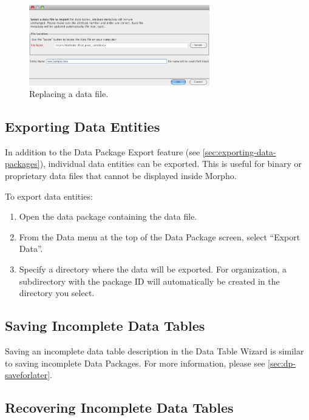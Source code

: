 \begin{figure}
  \centering
    \includegraphics[width=0.7\textwidth]{images/replace-data-location.png}
  \caption{Replacing a data file.}
  \label{fig:replace-data-location}
\end{figure}

\subsection[Exporting Data Entities]{Exporting Data Entities}
\label{sec:exporting-entities}

In addition to the Data Package Export feature (see \autoref{sec:exporting-data-packages}),
individual data entities can be exported. This is useful for binary or proprietary 
data files that cannot be displayed inside Morpho.

To export data entities:
\begin{enumerate}
  \item Open the data package containing the data file.
  \item From the Data menu at the top of the Data Package screen, 
  select ``Export Data''.
  \item Specify a directory where the data will be exported.
   For organization, a subdirectory with the package ID will 
   automatically be created in the directory you select.
\end{enumerate}

\subsection{Saving Incomplete Data Tables }

Saving an incomplete data table description in the Data Table Wizard is
similar to saving incomplete Data Packages. For more information, please
see \autoref{sec:dp-saveforlater}.

\subsection{Recovering Incomplete Data Tables}

